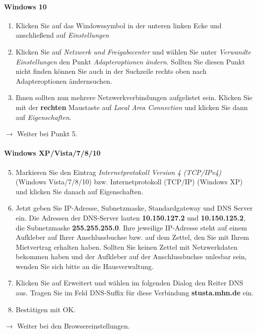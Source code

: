 \documentclass[a4paper,12pt]{scrartcl}
\begin{document}
\paragraph*{Windows 10}
\begin{enumerate}
	\item Klicken Sie auf das Windowssymbol in der unteren linken Ecke und anschließend auf \emph{Einstellungen}
	\item Klicken Sie auf \textit{Netzwerk und Freigabecenter} und wählen Sie unter \textit{Verwandte Einstellungen} den Punkt \textit{Adapteroptionen ändern}. Sollten Sie diesen Punkt nicht finden können Sie auch in der Suchzeile rechts oben nach \glqq Adapteroptionen ändern\grqq suchen.
    \item Ihnen sollten nun mehrere Netzwerkverbindungen aufgelistet sein. Klicken Sie mit der \textbf{rechten} Maustaste auf \textit{Local Area Connection} und klicken Sie dann auf \textit{Eigenschaften}.
\end{enumerate}
$\rightarrow$ Weiter bei Punkt 5.

\paragraph*{Windows XP/Vista/7/8/10}
\begin{enumerate}
    \setcounter{enumi}{4}
    \item Markieren Sie den Eintrag \textit{Internetprotokoll Version 4 (TCP/IPv4)} (Windows Vista/7/8/10) bzw. Internetprotokoll  (TCP/IP) (Windows XP) und klicken Sie danach auf Eigenschaften.
    \item Jetzt geben Sie IP-Adresse, Subnetzmaske, Standardgateway und DNS Server ein. Die Adressen der DNS-Server lauten \textbf{10.150.127.2} und \textbf{10.150.125.2}, die Subnetzmaske \textbf{255.255.255.0}. Ihre jeweilige IP-Adresse steht auf einem Aufkleber auf Ihrer Anschlussbuchse bzw. auf dem Zettel, den Sie mit Ihrem Mietvertrag erhalten haben. Sollten Sie keinen Zettel mit Netzwerkdaten bekommen haben und der Aufkleber auf der Anschlussbuchse unlesbar sein, wenden Sie sich bitte an die Hausverwaltung.
    \item Klicken Sie auf Erweitert und wählen im folgenden Dialog den Reiter DNS aus. Tragen Sie im Feld DNS-Suffix für diese Verbindung \textbf{stusta.mhn.de} ein.
    \item Bestätigen mit OK.
\end{enumerate}
$\rightarrow$ Weiter bei den Browsereinstellungen.
\end{document}

